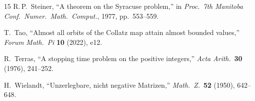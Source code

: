 \documentclass[11pt,a4paper]{article}
\theoremstyle{plain}
\theoremstyle{definition}
\begin{document}
\begin{thebibliography}{15}
R.\,P.~Steiner, ``A theorem on the Syracuse problem,''
in \textit{Proc.\ 7th Manitoba Conf.\ Numer.\ Math.\ Comput.}, 1977, pp.~553--559.

T.~Tao, ``Almost all orbits of the Collatz map attain almost bounded values,''
\textit{Forum Math.\ Pi} \textbf{10} (2022), e12.

R.~Terras, ``A stopping time problem on the positive integers,''
\textit{Acta Arith.}\ \textbf{30} (1976), 241--252.

H.~Wielandt, ``Unzerlegbare, nicht negative Matrizen,''
\textit{Math.\ Z.}\ \textbf{52} (1950), 642--648.

\end{thebibliography}
\end{document}
